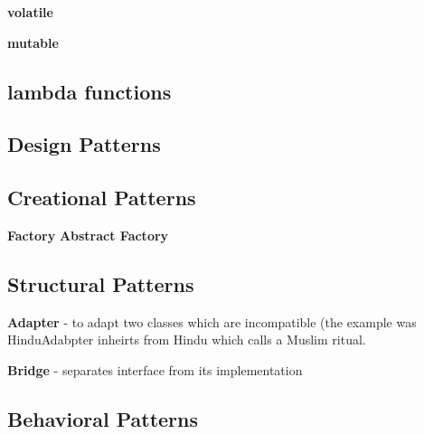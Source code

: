 \textbf{volatile}

\textbf{mutable}

\subsection{lambda functions}

\subsection{Design Patterns}

\subsection{Creational Patterns}
\textbf{Factory}
\textbf{Abstract Factory}

\subsection{Structural Patterns} 

\textbf{Adapter} - to adapt two classes which are incompatible (the example was HinduAdabpter inheirts from Hindu which calls a Muslim ritual.

\textbf{Bridge} - separates interface from its implementation

\subsection{Behavioral Patterns}
